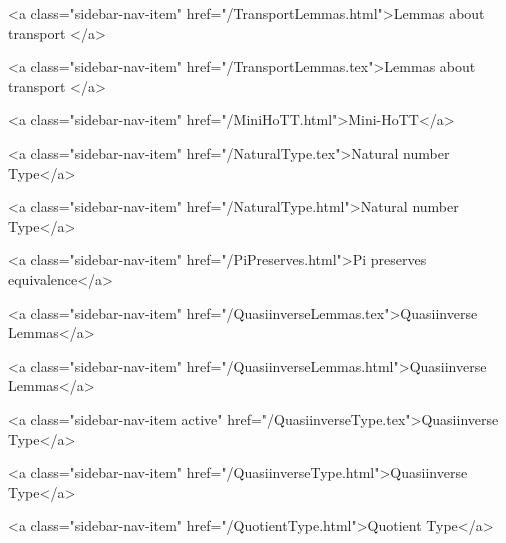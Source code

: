       
        
          <a class="sidebar-nav-item" href="/TransportLemmas.html">Lemmas about transport </a>
        
      
    
      
        
          <a class="sidebar-nav-item" href="/TransportLemmas.tex">Lemmas about transport </a>
        
      
    
      
        
          <a class="sidebar-nav-item" href="/MiniHoTT.html">Mini-HoTT</a>
        
      
    
      
        
          <a class="sidebar-nav-item" href="/NaturalType.tex">Natural number Type</a>
        
      
    
      
        
          <a class="sidebar-nav-item" href="/NaturalType.html">Natural number Type</a>
        
      
    
      
        
          <a class="sidebar-nav-item" href="/PiPreserves.html">Pi preserves equivalence</a>
        
      
    
      
        
          <a class="sidebar-nav-item" href="/QuasiinverseLemmas.tex">Quasiinverse Lemmas</a>
        
      
    
      
        
          <a class="sidebar-nav-item" href="/QuasiinverseLemmas.html">Quasiinverse Lemmas</a>
        
      
    
      
        
          <a class="sidebar-nav-item active" href="/QuasiinverseType.tex">Quasiinverse Type</a>
        
      
    
      
        
          <a class="sidebar-nav-item" href="/QuasiinverseType.html">Quasiinverse Type</a>
        
      
    
      
        
          <a class="sidebar-nav-item" href="/QuotientType.html">Quotient Type</a>
        
